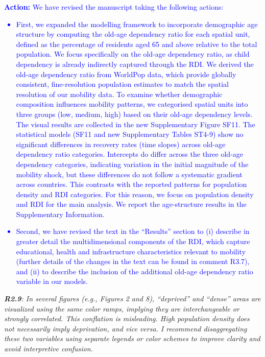 \documentclass[12pt,a4paper,oneside, reqno]{amsart}
\begin{document}
\textcolor{blue}{
\textbf{Action:} We have revised the manuscript taking the following actions:
\begin{itemize}[noitemsep, topsep=0pt]
    \item First, we expanded the modelling framework to incorporate demographic age structure by computing the old-age dependency ratio for each spatial unit, defined as the percentage of residents aged 65 and above relative to the total population. We focus specifically on the old-age dependency ratio, as child dependency is already indirectly captured through the RDI. We derived the old-age dependency ratio from WorldPop data, which provide globally consistent, fine-resolution population estimates to match the spatial resolution of our mobility data. To examine whether demographic composition influences mobility patterns, we categorised spatial units into three groups (low, medium, high) based on their old-age dependency levels. The visual results are collected in the new Supplementary Figure SF11. The statistical models (SF11 and new Supplementary Tables ST4-9) show no significant differences in recovery rates (time slopes) across old-age dependency ratio categories. Intercepts do differ across the three old-age dependency categories, indicating variation in the initial magnitude of the mobility shock, but these differences do not follow a systematic gradient across countries. This contrasts with the reported patterns for population density and RDI categories. For this reason, we focus on population density and RDI for the main analysis. We report the age-structure results in the Supplementary Information.
    \item Second, we have revised the text in the ``Results'' section to (i) describe in greater detail the multidimensional components of the RDI, which capture educational, health and infrastructure characteristics relevant to mobility (further details of the changes in the text can be found in comment R3.7), and (ii) to describe the inclusion of the additional old-age dependency ratio variable in our models.
\end{itemize}
}


\setlength{\leftskip}{0cm} \textit{\textbf{R2.9}: In several figures (e.g., Figures 2 and 8), ``deprived'' and ``dense'' areas are visualized using the same color ramps, implying they are interchangeable or strongly correlated. This conflation is misleading. High population density does not necessarily imply deprivation, and vice versa. I recommend disaggregating these two variables using separate legends or color schemes to improve clarity and avoid interpretive confusion.}
\end{document}
